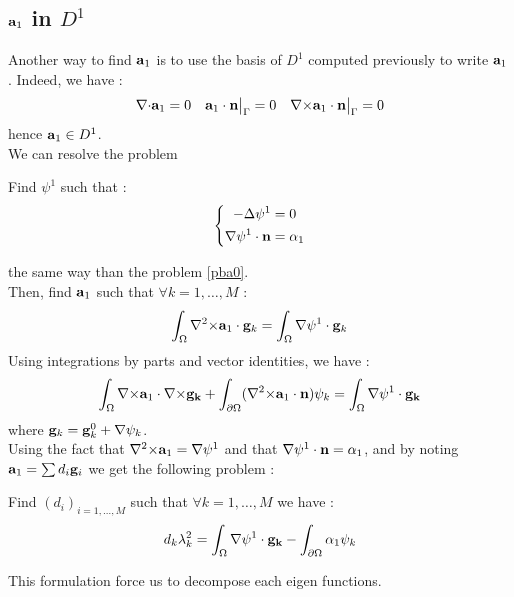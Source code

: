 \subsection{${\mathbf{a}}_1$ in $D^1$}
Another way to find ${\mathbf{a}}_1$ is to use the basis of $D^1$ computed previously to write ${\mathbf{a}}_1$. Indeed, we have :
\[ {\nabla\cdot}{\mathbf{a}}_1=0\quad {\mathbf{a}}_1\cdot{\mathbf{n}}{\big\rvert_{\Gamma}}=0\quad {\nabla\times}{\mathbf{a}}_1\cdot{\mathbf{n}}{\big\rvert_{\Gamma}}=0\]
hence ${\mathbf{a}}_1\in D^1$.\\
We can resolve the problem
\begin{pb}
  Find $\psi^1$ such that :
  \begin{equation*}
    \left\{
    \begin{aligned}
      -{\Delta}\psi^1 &= 0\\
      {\nabla}\psi^1\cdot{\mathbf{n}} &= \alpha_1
    \end{aligned}
    \right.
  \end{equation*}
\end{pb}
the same way than the problem \ref{pba0}.\\
Then, find ${\mathbf{a}}_1$ such that $\forall k=1,\dots,M$ :
\[ \int_\Omega {\nabla^2\times}{\mathbf{a}}_1\cdot{\mathbf{g}}_k = \int_\Omega {\nabla}\psi^1\cdot{\mathbf{g}}_k \]
Using integrations by parts and vector identities, we have :
\[ \int_\Omega {\nabla\times}{\mathbf{a}}_1\cdot{\nabla\times}{\mathbf{g_k}} + \int_{\partial\Omega}({\nabla^2\times}{\mathbf{a}}_1\cdot{\mathbf{n}})\psi_k = \int_\Omega {\nabla}\psi^1\cdot{\mathbf{g_k}} \]
where ${\mathbf{g}}_k={\mathbf{g}}^0_k+{\nabla}\psi_k$.\\
Using the fact that ${\nabla^2\times}{\mathbf{a}}_1={\nabla}\psi^1$ and that ${\nabla}\psi^1\cdot{\mathbf{n}}=\alpha_1$, and by noting ${\mathbf{a}}_1=\sum d_i{\mathbf{g}}_i$ we get the following problem :
\begin{pb}\label{pbbd1}
  Find $(d_i)_{i=1,\dots,M}$ such that $\forall k=1,\dots,M$ we have :
  \[ d_k\lambda_k^2 = \int_\Omega {\nabla}\psi^1\cdot{\mathbf{g_k}} - \int_{\partial\Omega} \alpha_1\psi_k \]
\end{pb}

\begin{rk}
  This formulation force us to decompose each eigen functions.
\end{rk}

